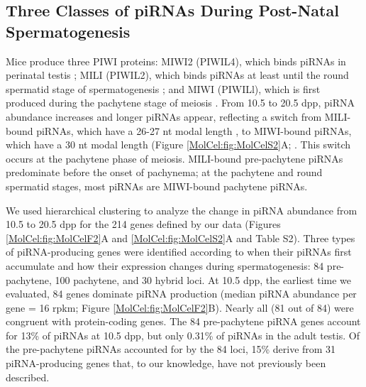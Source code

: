   \subsection{Three Classes of piRNAs During Post-Natal Spermatogenesis}
    \label{MolCel:subsec:Three Classes of piRNAs in testes}

    Mice produce three PIWI proteins: MIWI2 (PIWIL4), which binds piRNAs in perinatal testis \citep{Carmell2007, Aravin2008a}; MILI (PIWIL2), which binds piRNAs at least until the round spermatid stage of spermatogenesis \citep{Kuramochi-Miyagawa2004, Aravin2006, Aravin2007a}; and MIWI (PIWILl), which is first produced during the pachytene stage of meiosis \citep{Deng2002c}. From 10.5 to 20.5 dpp, piRNA abundance increases and longer piRNAs appear, reflecting a switch from MILI-bound piRNAs, which have a 26-27 nt modal length \citep{Montgomery1998, Aravin2006, Aravin2008a, Robine2009}, to MIWI-bound piRNAs, which have a 30 nt modal length (Figure \ref{MolCel:fig:MolCelS2}A; \citep{Reuter2009, Robine2009}. This switch occurs at the pachytene phase of meiosis. MILI-bound pre-pachytene piRNAs predominate before the onset of pachynema; at the pachytene and round spermatid stages, most piRNAs are MIWI-bound pachytene piRNAs.

    We used hierarchical clustering to analyze the change in piRNA abundance from 10.5 to 20.5 dpp for the 214 genes defined by our data (Figures \ref{MolCel:fig:MolCelF2}A and \ref{MolCel:fig:MolCelS2}A and Table S2). Three types of piRNA-producing genes were identified according to when their piRNAs first accumulate and how their expression changes during spermatogenesis: 84 pre-pachytene, 100 pachytene, and 30 hybrid loci. At 10.5 dpp, the earliest time we evaluated, 84 genes dominate piRNA production (median piRNA abundance per gene = 16 rpkm; Figure \ref{MolCel:fig:MolCelF2}B). Nearly all (81 out of 84) were congruent with protein-coding genes. The 84 pre-pachytene piRNA genes account for 13\% of piRNAs at 10.5 dpp, but only 0.31\% of piRNAs in the adult testis. Of the pre-pachytene piRNAs accounted for by the 84 loci, 15\% derive from 31 piRNA-producing genes that, to our knowledge, have not previously been described.

